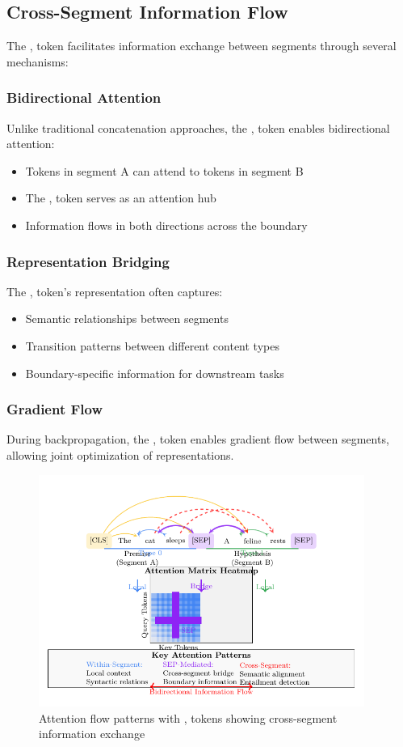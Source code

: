 \subsection{Cross-Segment Information Flow}

The \sep{} token facilitates information exchange between segments through several mechanisms:

\subsubsection{Bidirectional Attention}
Unlike traditional concatenation approaches, the \sep{} token enables bidirectional attention:
\begin{itemize}
\item Tokens in segment A can attend to tokens in segment B
\item The \sep{} token serves as an attention hub
\item Information flows in both directions across the boundary
\end{itemize}

\subsubsection{Representation Bridging}
The \sep{} token's representation often captures:
\begin{itemize}
\item Semantic relationships between segments
\item Transition patterns between different content types
\item Boundary-specific information for downstream tasks
\end{itemize}

\subsubsection{Gradient Flow}
During backpropagation, the \sep{} token enables gradient flow between segments, allowing joint optimization of representations.

\begin{figure}[h]
\centering
\includegraphics[width=0.95\textwidth]{part1/chapter02/fig_sep_attention_flow.pdf}
\caption{Attention flow patterns with \sep{} tokens showing cross-segment information exchange}
\label{fig:sep_attention_flow}
\end{figure}

